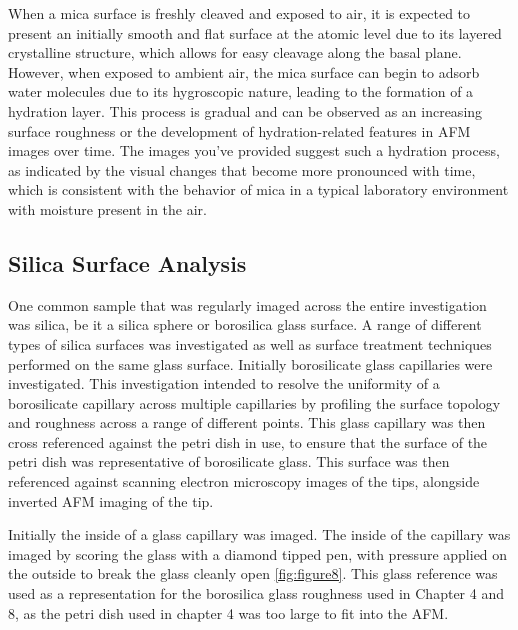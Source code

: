When a mica surface is freshly cleaved and exposed to air, it is expected to present an initially smooth and flat surface at the atomic level due to its layered crystalline structure, which allows for easy cleavage along the basal plane. However, when exposed to ambient air, the mica surface can begin to adsorb water molecules due to its hygroscopic nature, leading to the formation of a hydration layer. This process is gradual and can be observed as an increasing surface roughness or the development of hydration-related features in AFM images over time. The images you've provided suggest such a hydration process, as indicated by the visual changes that become more pronounced with time, which is consistent with the behavior of mica in a typical laboratory environment with moisture present in the air. \cite{MicaSurf, MicaHgryo, Koishi2022WaterAdsorption}

\subsection{Silica Surface Analysis}

 One common sample that was regularly imaged across the entire investigation was silica, be it a silica sphere or borosilica glass surface. A range of different types of silica surfaces was investigated as well as surface treatment techniques performed on the same glass surface. Initially borosilicate glass capillaries were investigated. This investigation intended to resolve the uniformity of a borosilicate capillary across multiple capillaries by profiling the surface topology and roughness across a range of different points. This glass capillary was then cross referenced against the petri dish in use, to ensure that the surface of the petri dish was representative of borosilicate glass. This surface was then referenced against scanning electron microscopy images of the tips, alongside inverted AFM imaging of the tip.

Initially the inside of a glass capillary was imaged. The inside of the capillary was imaged by scoring the glass with a diamond tipped pen, with pressure applied on the outside to break the glass cleanly open \ref{fig:figure8}. This glass reference was used as a representation for the borosilica glass roughness used in Chapter 4 and 8, as the petri dish used in chapter 4 was too large to fit into the AFM.

